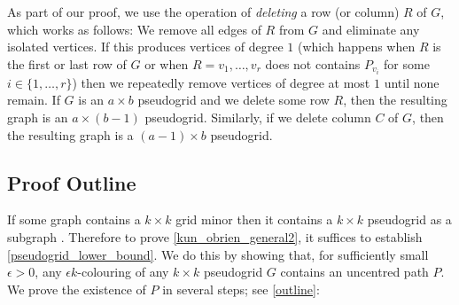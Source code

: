 \documentclass{patmorin}
\newcommand{\defin}[1]{\emph{\color{brightmaroon}#1}}
\begin{document}
As part of our proof, we use the operation of \defin{deleting} a row (or column) $R$ of $G$, which works as follows:  We remove all edges of $R$ from $G$ and eliminate any isolated vertices.  If this produces vertices of degree $1$ (which happens when $R$ is the first or last row of $G$ or when $R=v_1,\ldots,v_r$ does not contains $P_{v_i}$ for some $i\in\{1,\ldots,r\}$) then we repeatedly remove vertices of degree at most $1$ until none remain.  If $G$ is an $a\times b$ pseudogrid and we delete some row $R$, then the resulting graph is an $a\times (b-1)$ pseudogrid.  Similarly, if we delete column $C$ of $G$, then the resulting graph is a $(a-1)\times b$ pseudogrid.

\subsection{Proof Outline}

If some graph contains a $k\times k$ grid minor then it contains a $k\times k$ pseudogrid as a subgraph \cite{kun.obrien.ea:polynomial}.  Therefore to prove \cref{kun_obrien_general2}, it suffices to establish \cref{pseudogrid_lower_bound}.  We do this by showing that, for sufficiently small $\epsilon >0$, any $\epsilon k$-colouring of any $k\times k$ pseudogrid $G$ contains an uncentred path $P$. We prove the existence of $P$ in several steps; see \cref{outline}:
\end{document}
